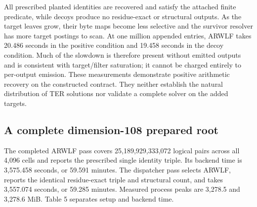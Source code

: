 \documentclass[manuscript,screen,review]{acmart}
\begin{document}
All prescribed planted identities are recovered and satisfy the attached finite predicate, while decoys produce no residue-exact or structural outputs. As the target leaves grow, their byte maps become less selective and the survivor resolver has more target postings to scan. At one million appended entries, ARWLF takes 20.486 seconds in the positive condition and 19.458 seconds in the decoy condition. Much of the slowdown is therefore present without emitted outputs and is consistent with target/filter saturation; it cannot be charged entirely to per-output emission. These measurements demonstrate positive arithmetic recovery on the constructed contract. They neither establish the natural distribution of TER solutions nor validate a complete solver on the added targets.

\subsection{A complete dimension-108 prepared root}
The completed ARWLF pass covers 25,189,929,333,072 logical pairs across all 4,096 cells and reports the prescribed single identity triple. Its backend time is 3,575.458 seconds, or 59.591 minutes. The dispatcher pass selects ARWLF, reports the identical residue-exact triple and structural count, and takes 3,557.074 seconds, or 59.285 minutes. Measured process peaks are 3,278.5 and 3,278.6 MiB. Table 5 separates setup and backend time.
\end{document}
